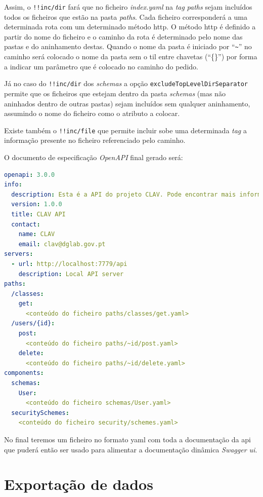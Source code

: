Assim, o \texttt{!!inc/dir} fará que no ficheiro \textit{index.yaml} na \textit{tag} \textit{paths} sejam incluídos todos os ficheiros que estão na pasta \textit{paths}. Cada ficheiro corresponderá a uma determinada rota com um determinado método \acrshort{http}. O método \acrshort{http} é definido a partir do nome do ficheiro e o caminho da rota é determinado pelo nome das pastas e do aninhamento destas. Quando o nome da pasta é iniciado por ``\verb|~|'' no caminho será colocado o nome da pasta sem o til entre chavetas (``\{\}'') por forma a indicar um parâmetro que é colocado no caminho do pedido.

Já no caso do \texttt{!!inc/dir} dos \textit{schemas} a opção \texttt{excludeTopLevelDirSeparator} permite que os ficheiros que estejam dentro da pasta \textit{schemas} (mas não aninhados dentro de outras pastas) sejam incluídos sem qualquer aninhamento, assumindo o nome do ficheiro como o atributo a colocar.

Existe também o \texttt{!!inc/file} que permite incluir sobe uma determinada \textit{tag} a informação presente no ficheiro referenciado pelo caminho.

O documento de especificação \textit{OpenAPI} final gerado será:
\begin{lstlisting}[language=yaml, caption=Documento de especificação \textit{OpenAPI} gerado a partir do ficheiro \textit{index.yaml} com o uso da \textit{package} \texttt{yaml-include}, label=exem:yamlif]
openapi: 3.0.0
info:
  description: Esta é a API do projeto CLAV. Pode encontrar mais informação sobre o CLAV em [http://clav.dglab.gov.pt](http://clav.dglab.gov.pt).
  version: 1.0.0
  title: CLAV API
  contact:
    name: CLAV
    email: clav@dglab.gov.pt
servers:
  - url: http://localhost:7779/api
    description: Local API server
paths:
  /classes:
    get:
      <conteúdo do ficheiro paths/classes/get.yaml>
  /users/{id}:
    post:
      <conteúdo do ficheiro paths/~id/post.yaml>
    delete:
      <conteúdo do ficheiro paths/~id/delete.yaml>
components:
  schemas:
    User:
      <conteúdo do ficheiro schemas/User.yaml>
  securitySchemes:
    <conteúdo do ficheiro security/schemes.yaml>
\end{lstlisting}

No final teremos um ficheiro no formato \acrshort{yaml} com toda a documentação da \acrshort{api} que puderá então ser usado para alimentar a documentação dinâmica \textit{Swagger \acrshort{ui}}.

\section{Exportação de dados}

